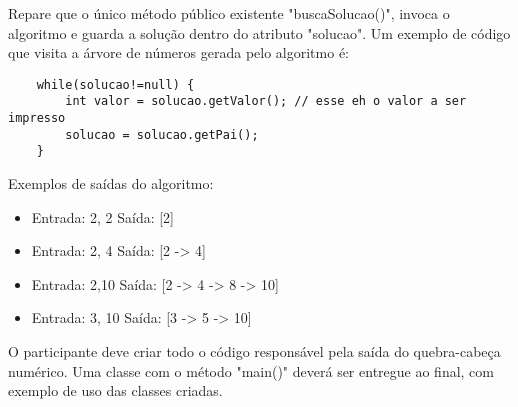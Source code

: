 Repare que o único método público existente "buscaSolucao()", invoca o algoritmo e guarda a solução
dentro do atributo "solucao". Um exemplo de código que visita a árvore de números gerada pelo algoritmo é:

\begin{lstlisting}
	while(solucao!=null) {
		int valor = solucao.getValor(); // esse eh o valor a ser impresso
		solucao = solucao.getPai();
	}
\end{lstlisting}

Exemplos de saídas do algoritmo:

\begin{itemize}
	\item Entrada: 2, 2 Saída: [2]
	\item Entrada: 2, 4 Saída: [2 -> 4]
	\item Entrada: 2,10 Saída: [2 -> 4 -> 8 -> 10]
	\item Entrada: 3, 10 Saída: [3 -> 5 -> 10]
\end{itemize}

O participante deve criar todo o código responsável pela saída do quebra-cabeça numérico. Uma classe com
o método "main()" deverá ser entregue ao final, com exemplo de uso das classes criadas.

